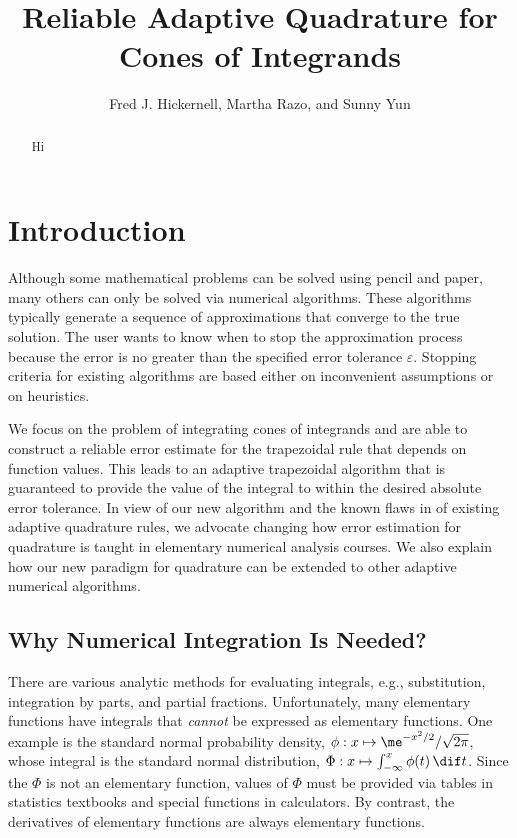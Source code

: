 \documentclass[]{article}
\theoremstyle{definition}
\theoremstyle{remark}
\begin{document}
\title{Reliable Adaptive Quadrature for Cones of Integrands}
\author{Fred J. Hickernell, Martha Razo, and Sunny Yun}
\maketitle 


\begin{abstract} Hi
\end{abstract}


\section{Introduction} 

Although some mathematical problems can be solved using pencil and paper, many others can only be solved via numerical algorithms.  These algorithms typically generate a sequence of approximations that converge to the true solution.  The user wants to know when to stop the approximation process because the error is no greater than the specified error tolerance $\varepsilon$.  Stopping criteria for existing algorithms are based either on inconvenient assumptions or on heuristics.  

We focus on the problem of integrating cones of integrands and are able to construct a reliable error estimate for the trapezoidal rule that depends on function values.  This leads to an adaptive trapezoidal algorithm that is guaranteed to provide the value of the integral to within the desired absolute error tolerance.  In view of our new algorithm and the known flaws in of existing adaptive quadrature rules, we advocate changing how error estimation for quadrature is taught in elementary numerical analysis courses.  We also explain how our new paradigm for quadrature can be extended to other adaptive numerical algorithms.

\subsection{Why Numerical Integration Is Needed?}
There are various analytic methods for evaluating integrals, e.g., substitution, integration by parts, and partial fractions.  Unfortunately, many elementary functions have integrals that \emph{cannot} be expressed as elementary functions.  One example is the standard normal probability density, $\phi: x \mapsto \me^{-x^2/2}/\sqrt{2 \pi}$, whose integral is the standard normal distribution, $\Phi : x \mapsto \int_{-\infty}^x \phi(t) \, \dif t$.  Since the $\Phi$ is not an elementary function, values of $\Phi$ must be provided via tables in statistics textbooks and special functions in calculators. By contrast, the derivatives of elementary functions are always elementary functions.  
\end{document}
